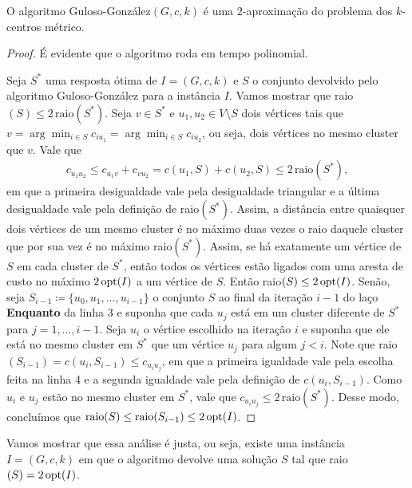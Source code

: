 \begin{theorem}
    O algoritmo {\sc Guloso-González}$(G,c,k)$ é uma $2$-aproximação do problema dos $k$-centros métrico.
\end{theorem}
\begin{proof}
    É evidente que o algoritmo roda em tempo polinomial. 
  
    Seja $S^*$ uma resposta ótima de $I = (G,c,k)$ e $S$ o conjunto devolvido pelo algoritmo {\sc Guloso-González} para a instância $I$. Vamos mostrar que raio$(S) \leq 2\,\text{raio}(S^*) $. Seja $v \in S^*$ e ${u_1,u_2 \in V \setminus S}$ dois vértices tais que $ v = \arg\min_{i \in S} c_{iu_1} = \arg \min_{ i\in S} c_{iu_2}$, ou seja, dois vértices no mesmo cluster que $v$. Vale que
    \begin{align}
      c_{u_1u_2} \leq c_{u_1v} + c_{v u _2} = c(u_1,S) + c(u_2,S) \leq 2\, \text{raio}(S^*), \nonumber
    \end{align}
    em que a primeira desigualdade vale pela desigualdade triangular e a última desigualdade vale pela definição de raio$(S^*)$. Assim, a distância entre quaisquer dois vértices de um mesmo cluster é no máximo duas vezes o raio daquele cluster que por sua vez é no máximo raio$(S^*)$.
    Assim, se há exatamente um vértice de $S$ em cada cluster de $S^*$, então todos os vértices estão ligados com uma aresta de custo no máximo $2\,\mathrm{opt}(I)$ a um vértice de $S$. Então raio$(S) \leq 2\,\mathrm{opt}(I)$. Senão, seja $S_{i-1} \coloneqq \{ u_0,u_1,\ldots,u_{i-1}\}$ o conjunto $S$ ao final da iteração $i-1$ do laço {\bf Enquanto} da linha 3 e suponha que cada $u_j$ está em um cluster diferente de $S^*$ para $j = 1, \ldots, i-1$. Seja $u_i$ o vértice escolhido na iteração $i$ e suponha que ele está no mesmo cluster em $S^*$ que um vértice $u_j$ para algum $j<i$. Note que raio$(S_{i-1}) = c(u_i,S_{i-1}) \leq c_{u_iu_j}$, em que a primeira igualdade vale pela escolha feita na linha 4 e a segunda igualdade vale pela definição de $c(u_i,S_{i-1})$. Como $u_i$ e $u_j$ estão no mesmo cluster em $S^*$, vale que $c_{u_iu_j} \leq 2\,\text{raio}(S^*)$. Desse modo, concluímos que $\text{raio}(S) \leq \text{raio}(S_{i-1}) \leq 2\, \mathrm{opt}(I)$.
    
    
\end{proof}

Vamos mostrar que essa análise é justa, ou seja, existe uma instância $I = (G,c,k)$ em que o algoritmo devolve uma solução $S$ tal que raio$(S) = 2 \,\mathrm{opt}(I)$. 

